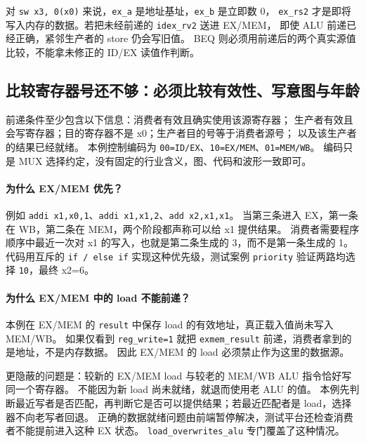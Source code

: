 对 \texttt{sw x3, 0(x0)} 来说，\texttt{ex\_a} 是地址基址，\texttt{ex\_b} 是立即数 0，
\texttt{ex\_rs2} 才是即将写入内存的数据。若把未经前递的 \texttt{idex\_rv2} 送进 EX/MEM，
即使 ALU 前递已经正确，紧邻生产者的 store 仍会写旧值。
BEQ 则必须用前递后的两个真实源值比较，不能拿未修正的 ID/EX 读值作判断。

\subsection{比较寄存器号还不够：必须比较有效性、写意图与年龄}

前递条件至少包含以下信息：消费者有效且确实使用该源寄存器；
生产者有效且会写寄存器；目的寄存器不是 x0；生产者目的号等于消费者源号；
以及该生产者的结果已经就绪。
本例控制编码为 \texttt{00=ID/EX}、\texttt{10=EX/MEM}、\texttt{01=MEM/WB}。
编码只是 MUX 选择约定，没有固定的行业含义，图、代码和波形一致即可。

\par\noindent\begin{minipage}{\linewidth}\vspace{8pt}

\end{minipage}\par

\paragraph{为什么 EX/MEM 优先？}
例如 \texttt{addi x1,x0,1}、\texttt{addi x1,x1,2}、\texttt{add x2,x1,x1}。
当第三条进入 EX，第一条在 WB，第二条在 MEM，两个阶段都声称可以给 x1 提供结果。
消费者需要程序顺序中最近一次对 x1 的写入，也就是第二条生成的 3，而不是第一条生成的 1。
代码用互斥的 \texttt{if / else if} 实现这种优先级，测试案例 \texttt{priority} 验证两路均选择 \texttt{10}，最终 x2=6。

\paragraph{为什么 EX/MEM 中的 load 不能前递？}
本例在 EX/MEM 的 \texttt{result} 中保存 load 的有效地址，真正载入值尚未写入 MEM/WB。
如果仅看到 \texttt{reg\_write=1} 就把 \texttt{exmem\_result} 前递，消费者拿到的是地址，不是内存数据。
因此 EX/MEM 的 load 必须禁止作为这里的数据源。

更隐蔽的问题是：较新的 EX/MEM load 与较老的 MEM/WB ALU 指令恰好写同一个寄存器。
不能因为新 load 尚未就绪，就退而使用老 ALU 的值。
本例先判断最近写者是否匹配，再判断它是否可以提供结果；若最近匹配者是 load，选择器不向老写者回退。
正确的数据就绪问题由前端暂停解决，测试平台还检查消费者不能提前进入这种 EX 状态。
\texttt{load\_overwrites\_alu} 专门覆盖了这种情况。

